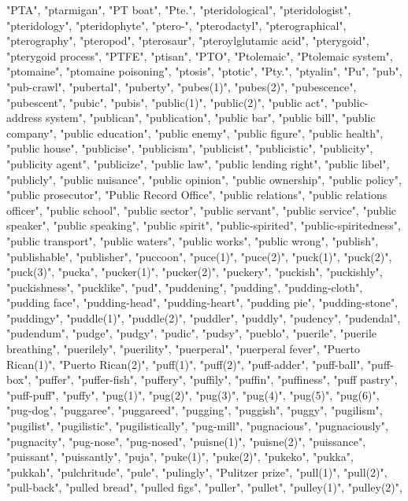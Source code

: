 "PTA",
"ptarmigan",
"PT boat",
"Pte.",
"pteridological",
"pteridologist",
"pteridology",
"pteridophyte",
"ptero-",
"pterodactyl",
"pterographical",
"pterography",
"pteropod",
"pterosaur",
"pteroylglutamic acid",
"pterygoid",
"pterygoid process",
"PTFE",
"ptisan",
"PTO",
"Ptolemaic",
"Ptolemaic system",
"ptomaine",
"ptomaine poisoning",
"ptosis",
"ptotic",
"Pty.",
"ptyalin",
"Pu",
"pub",
"pub-crawl",
"pubertal",
"puberty",
"pubes(1)",
"pubes(2)",
"pubescence",
"pubescent",
"pubic",
"pubis",
"public(1)",
"public(2)",
"public act",
"public-address system",
"publican",
"publication",
"public bar",
"public bill",
"public company",
"public education",
"public enemy",
"public figure",
"public health",
"public house",
"publicise",
"publicism",
"publicist",
"publicistic",
"publicity",
"publicity agent",
"publicize",
"public law",
"public lending right",
"public libel",
"publicly",
"public nuisance",
"public opinion",
"public ownership",
"public policy",
"public prosecutor",
"Public Record Office",
"public relations",
"public relations officer",
"public school",
"public sector",
"public servant",
"public service",
"public speaker",
"public speaking",
"public spirit",
"public-spirited",
"public-spiritedness",
"public transport",
"public waters",
"public works",
"public wrong",
"publish",
"publishable",
"publisher",
"puccoon",
"puce(1)",
"puce(2)",
"puck(1)",
"puck(2)",
"puck(3)",
"pucka",
"pucker(1)",
"pucker(2)",
"puckery",
"puckish",
"puckishly",
"puckishness",
"pucklike",
"pud",
"puddening",
"pudding",
"pudding-cloth",
"pudding face",
"pudding-head",
"pudding-heart",
"pudding pie",
"pudding-stone",
"puddingy",
"puddle(1)",
"puddle(2)",
"puddler",
"puddly",
"pudency",
"pudendal",
"pudendum",
"pudge",
"pudgy",
"pudic",
"pudsy",
"pueblo",
"puerile",
"puerile breathing",
"puerilely",
"puerility",
"puerperal",
"puerperal fever",
"Puerto Rican(1)",
"Puerto Rican(2)",
"puff(1)",
"puff(2)",
"puff-adder",
"puff-ball",
"puff-box",
"puffer",
"puffer-fish",
"puffery",
"puffily",
"puffin",
"puffiness",
"puff pastry",
"puff-puff",
"puffy",
"pug(1)",
"pug(2)",
"pug(3)",
"pug(4)",
"pug(5)",
"pug(6)",
"pug-dog",
"puggaree",
"puggareed",
"pugging",
"puggish",
"puggy",
"pugilism",
"pugilist",
"pugilistic",
"pugilistically",
"pug-mill",
"pugnacious",
"pugnaciously",
"pugnacity",
"pug-nose",
"pug-nosed",
"puisne(1)",
"puisne(2)",
"puissance",
"puissant",
"puissantly",
"puja",
"puke(1)",
"puke(2)",
"pukeko",
"pukka",
"pukkah",
"pulchritude",
"pule",
"pulingly",
"Pulitzer prize",
"pull(1)",
"pull(2)",
"pull-back",
"pulled bread",
"pulled figs",
"puller",
"pullet",
"pulley(1)",
"pulley(2)",
